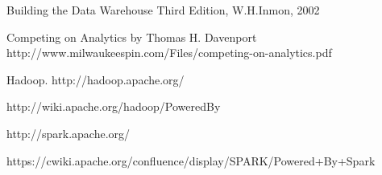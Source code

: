 \documentclass[10pt,journal,compsoc]{IEEEtran}
\begin{document}
\begin{thebibliography}{1}
Building the Data Warehouse Third Edition, W.H.Inmon, 2002

Competing on Analytics by Thomas H. Davenport
http://www.milwaukeespin.com/Files/competing-on-analytics.pdf

Hadoop. http://hadoop.apache.org/

http://wiki.apache.org/hadoop/PoweredBy

http://spark.apache.org/

https://cwiki.apache.org/confluence/display/SPARK/Powered+By+Spark

\end{thebibliography}
\end{document}
